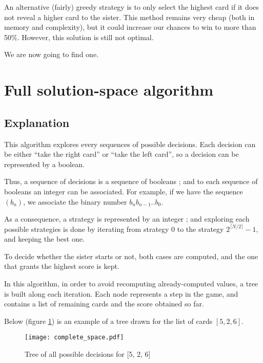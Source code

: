 \documentclass[11pt]{article}
\begin{document}
An alternative (fairly) greedy strategy is to only select the highest card if it does not reveal a higher card to the sister. This method
remains very cheap (both in memory and complexity), but it could increase our chances to win to more than 50\%.
However, this solution is still not optimal.

We are now going to find one.

\section{Full solution-space algorithm}
\subsection{Explanation}
This algorithm explores every sequences of possible decisions. Each decision can
be either ``take the right card'' or ``take the left card'', so a decision can be
represented by a boolean.

Thus, a sequence of decisions is a sequence of booleans ; and to each sequence 
of booleans an integer can be associated. For example, if we have the sequence
$(b_n)$, we associate the binary number $b_nb_{n-1}..b_0$.

As a consequence, a strategy is represented by an integer ; and
exploring each possible strategies is done by iterating from strategy 0 to the
strategy $2^{\lceil{N/2}\rceil} - 1$, and keeping the best one.

To decide whether the sister starts or not, both cases are computed, and
the one that grants the highest score is kept.

In this algorithm, in order to avoid recomputing already-computed values,
a tree is built along each iteration. Each node represents a step in the game,
and contains a list of remaining cards and the score obtained so far.

Below (figure \ref{tree}) is an example of a tree drawn 
for the list of cards $[5, 2, 6]$.
\begin{figure}[!h]
	\center
	\label{tree}
	\texttt{[image: complete\_space.pdf]}
	\caption{Tree of all possible decisions for [5, 2, 6]}
\end{figure}
\end{document}
